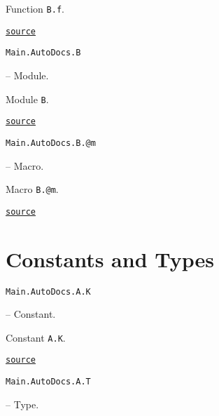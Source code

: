 \begin{adjustwidth}{2em}{0pt}

Function \texttt{B.f}.



\href{https://github.com/BambOoxX/Documenter.jl/blob/d157febde213549ed0d45c894f0651560da477d3/test/examples/make.jl#L115}{\texttt{source}}


\end{adjustwidth}
\hypertarget{11339106303250130801}{\texttt{Main.AutoDocs.B}}  -- {Module.}

\begin{adjustwidth}{2em}{0pt}

Module \texttt{B}.



\href{https://github.com/BambOoxX/Documenter.jl/blob/d157febde213549ed0d45c894f0651560da477d3/test/examples/make.jl#L113}{\texttt{source}}


\end{adjustwidth}
\hypertarget{10335956018691630658}{\texttt{Main.AutoDocs.B.@m}}  -- {Macro.}

\begin{adjustwidth}{2em}{0pt}

Macro \texttt{B.@m}.



\href{https://github.com/BambOoxX/Documenter.jl/blob/d157febde213549ed0d45c894f0651560da477d3/test/examples/make.jl#L124}{\texttt{source}}


\end{adjustwidth}

\section{Constants and Types}



\label{18297180183977969663}{}

\hypertarget{17379154232303623334}{\texttt{Main.AutoDocs.A.K}}  -- {Constant.}

\begin{adjustwidth}{2em}{0pt}

Constant \texttt{A.K}.



\href{https://github.com/BambOoxX/Documenter.jl/blob/d157febde213549ed0d45c894f0651560da477d3/test/examples/make.jl#L103}{\texttt{source}}


\end{adjustwidth}
\hypertarget{1070558433006397272}{\texttt{Main.AutoDocs.A.T}}  -- {Type.}

